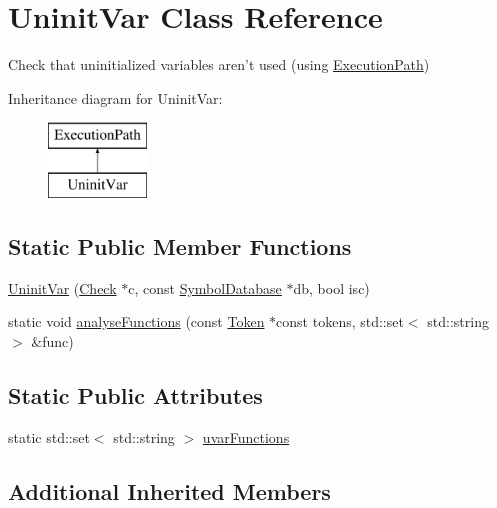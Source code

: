 \hypertarget{class_uninit_var}{\section{Uninit\-Var Class Reference}
\label{class_uninit_var}
}


Check that uninitialized variables aren't used (using \hyperlink{class_execution_path}{Execution\-Path})  


Inheritance diagram for Uninit\-Var\-:\begin{figure}[H]
\begin{center}
\leavevmode
\includegraphics[height=2.000000cm]{class_uninit_var}
\end{center}
\end{figure}
\subsection*{Static Public Member Functions}
\begin{DoxyCompactItemize}
\item 
\hyperlink{class_uninit_var_a75943845dd83ca57f36b45b736788bf9}{Uninit\-Var} (\hyperlink{class_check}{Check} $\ast$c, const \hyperlink{class_symbol_database}{Symbol\-Database} $\ast$db, bool isc)
\item 
static void \hyperlink{class_uninit_var_a68e9676afb263cf84d9edfcfdbb5fa2a}{analyse\-Functions} (const \hyperlink{class_token}{Token} $\ast$const tokens, std\-::set$<$ std\-::string $>$ \&func)
\end{DoxyCompactItemize}
\subsection*{Static Public Attributes}
\begin{DoxyCompactItemize}
\item 
static std\-::set$<$ std\-::string $>$ \hyperlink{group___checks_ga253dcf06ccb9bd907ea83454d47a8e8c}{uvar\-Functions}
\end{DoxyCompactItemize}
\subsection*{Additional Inherited Members}


